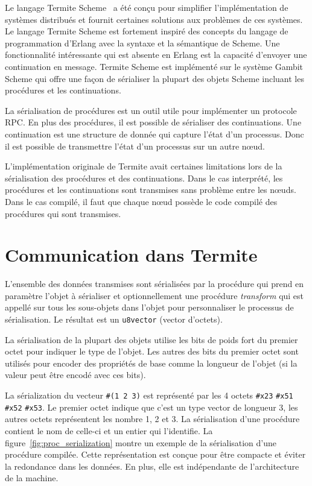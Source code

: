 Le langage Termite Scheme~\cite{DBLP:conf/erlang/Germain06} a été conçu
pour simplifier l'implémentation de systèmes distribués et fournit
certaines solutions aux problèmes de ces systèmes. Le langage Termite Scheme est
fortement inspiré des concepts du langage de programmation d'Erlang avec la
syntaxe et la sémantique de Scheme. Une fonctionnalité intéressante qui est
absente en Erlang est la capacité d'envoyer une continuation en message.
Termite Scheme est implémenté sur le système Gambit Scheme qui offre
une façon de sérialiser la plupart des objets Scheme incluant les
procédures et les continuations.

La sérialisation de procédures est un outil utile pour implémenter
un protocole RPC. En plus des procédures, il est possible de sérialiser
des continuations. Une continuation est une structure de donnée qui capture
l'état d'un processus. Donc il est possible de transmettre l'état d'un
processus sur un autre nœud.

L'implémentation originale de Termite avait certaines limitations
lors de la sérialisation des procédures et des continuations. Dans
le cas interprété, les procédures et les continuations sont transmises
sans problème entre les nœuds. Dans le cas compilé, il faut que
chaque nœud possède le code compilé des procédures qui sont transmises.


\section{Communication dans Termite}

L'ensemble des données transmises sont sérialisées par la procédure
 qui prend en paramètre l'objet à sérialiser et
optionnellement une procédure \textit{transform} qui est appellé sur tous les
sous-objets dans l'objet pour personnaliser le processus de sérialisation. Le
résultat est un \texttt{u8vector} (vector d'octets).

La sérialisation de la plupart des objets utilise les bits de poids fort du
premier octet pour indiquer le type de l'objet. Les autres des bits du premier
octet sont utilisés pour encoder des propriétés de base comme la longueur de
l'objet (si la valeur peut être encodé avec ces bits).

La sérialization du vecteur \texttt{\#(1 2 3)} est représenté par les 4 octets
\texttt{\#x23} \texttt{\#x51} \texttt{\#x52} \texttt{\#x53}.  Le premier octet
indique que c'est un type vector de longueur 3, les autres octets représentent
les nombre 1, 2 et 3.  La sérialisation d'une procédure contient le nom de
celle-ci et un entier qui l'identifie. La figure~\ref{fig:proc_serialization}
montre un exemple de la sérialisation d'une procédure compilée. Cette
représentation est conçue pour être compacte et éviter la redondance dans les
données. En plus, elle est indépendante de l'architecture de la machine.


